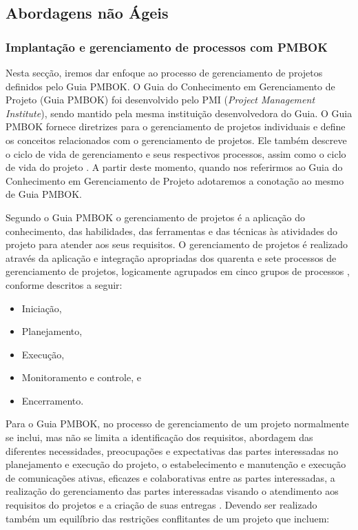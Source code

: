 \documentclass{acm_proc_article-sp}
\begin{document}
\subsection{Abordagens não Ágeis}
\subsubsection{Implantação e gerenciamento de processos com PMBOK}
Nesta secção, iremos dar enfoque ao processo de gerenciamento de projetos definidos pelo Guia PMBOK. O Guia do Conhecimento em Gerenciamento de Projeto (Guia PMBOK) foi desenvolvido pelo PMI (\textit{Project Management Institute}), sendo mantido pela mesma instituição desenvolvedora do Guia. O Guia PMBOK fornece diretrizes para o gerenciamento de projetos individuais e define os conceitos relacionados com o gerenciamento de projetos. Ele também descreve o ciclo de vida de gerenciamento e seus respectivos processos, assim como o ciclo de vida do projeto \cite{pmbok:nAgil}. A partir deste momento, quando nos referirmos ao Guia do Conhecimento em Gerenciamento de Projeto adotaremos a conotação ao mesmo de Guia PMBOK.

Segundo o Guia PMBOK o gerenciamento de projetos é a aplicação do conhecimento, das habilidades, das ferramentas e das técnicas às atividades do projeto para atender aos seus requisitos. O gerenciamento de projetos é realizado através da aplicação e integração apropriadas dos quarenta e sete processos de gerenciamento de projetos, logicamente agrupados em cinco grupos de processos \cite{pmbok:nAgil}, conforme descritos a seguir:

\begin{itemize}
\item Iniciação,
\item Planejamento,
\item Execução,
\item Monitoramento e controle, e
\item Encerramento.
\end{itemize}

Para o Guia PMBOK, no processo de gerenciamento de um projeto normalmente se inclui, mas não se limita a identificação dos requisitos, abordagem das diferentes necessidades, preocupações e expectativas das partes interessadas no planejamento e execução do projeto, o estabelecimento e manutenção e execução de comunicações ativas, eficazes e colaborativas entre as partes interessadas, a realização do gerenciamento das partes interessadas  visando o atendimento aos requisitos do projetos e a criação de suas entregas \cite{pmbok:nAgil}. Devendo ser realizado também um equilíbrio das restrições conflitantes de um projeto que incluem:
\end{document}
